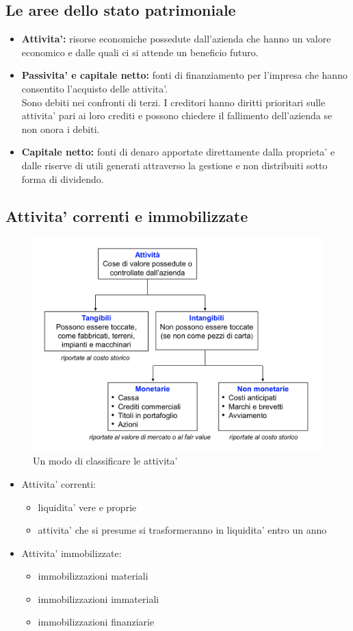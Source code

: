 \documentclass{report}
\newcommand\hr{\par\vspace{-.5\ht\strutbox}\noindent\hrulefill\par}
\begin{document}
	\subsection{Le aree dello stato patrimoniale}
	\begin{itemize}
		\item \textbf{Attivita':} risorse economiche possedute dall'azienda che hanno un valore economico e dalle quali ci si attende un beneficio futuro.
		\hr
		\item \textbf{Passivita' e capitale netto:} fonti di finanziamento per l'impresa che hanno consentito l'acquisto delle attivita'.
		\medskip \\Sono debiti nei confronti di terzi. I creditori hanno diritti prioritari sulle attivita' pari ai loro crediti e possono chiedere il fallimento dell'azienda se non onora i debiti.
		\item \textbf{Capitale netto:} fonti di denaro apportate direttamente dalla proprieta' e dalle riserve di utili generati attraverso la gestione e non distribuiti sotto forma di dividendo.
	\end{itemize}
	\subsection{Attivita' correnti e immobilizzate}
	\begin{figure}[h]
		\centering
		\caption{Un modo di classificare le attivita'}
		\label{fig:classificazione-attivita}
		\includegraphics[width=0.7\linewidth]{classificazione-attivita}
	\end{figure}
	\begin{itemize}
		\item Attivita' correnti:
		\begin{itemize}
			\item liquidita' vere e proprie
			\item attivita' che si presume si trasformeranno in liquidita' entro un anno \\
		\end{itemize}
		\item Attivita' immobilizzate:
		\begin{itemize}
			\item immobilizzazioni materiali
			\item immobilizzazioni immateriali
			\item immobilizzazioni finanziarie
		\end{itemize}
	\end{itemize}
\end{document}
